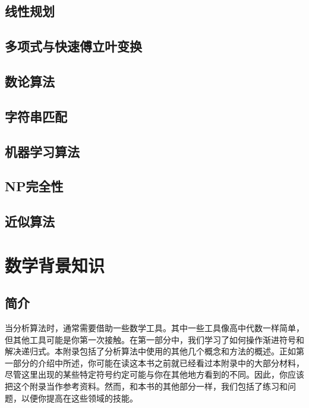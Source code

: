 \documentclass[lang=cn,newtx,10pt,scheme=chinese]{elegantbook}
\begin{document}
\chapter{线性规划}\label{chapter-29}

\chapter{多项式与快速傅立叶变换}\label{chapter-30}

\chapter{数论算法}\label{chapter-31}

\chapter{字符串匹配}\label{chapter-32}

\chapter{机器学习算法}\label{chapter-33}

\chapter{NP完全性}\label{chapter-34}

\chapter{近似算法}\label{chapter-35}

\appendix

\part{数学背景知识}

\chapter*{简介}

当分析算法时，通常需要借助一些数学工具。其中一些工具像高中代数一样简单，但其他工具可能是你第一次接触。在第一部分中，我们学习了如何操作渐进符号和解决递归式。本附录包括了分析算法中使用的其他几个概念和方法的概述。正如第一部分的介绍中所述，你可能在读这本书之前就已经看过本附录中的大部分材料，尽管这里出现的某些特定符号约定可能与你在其他地方看到的不同。因此，你应该把这个附录当作参考资料。然而，和本书的其他部分一样，我们包括了练习和问题，以便你提高在这些领域的技能。
\end{document}
